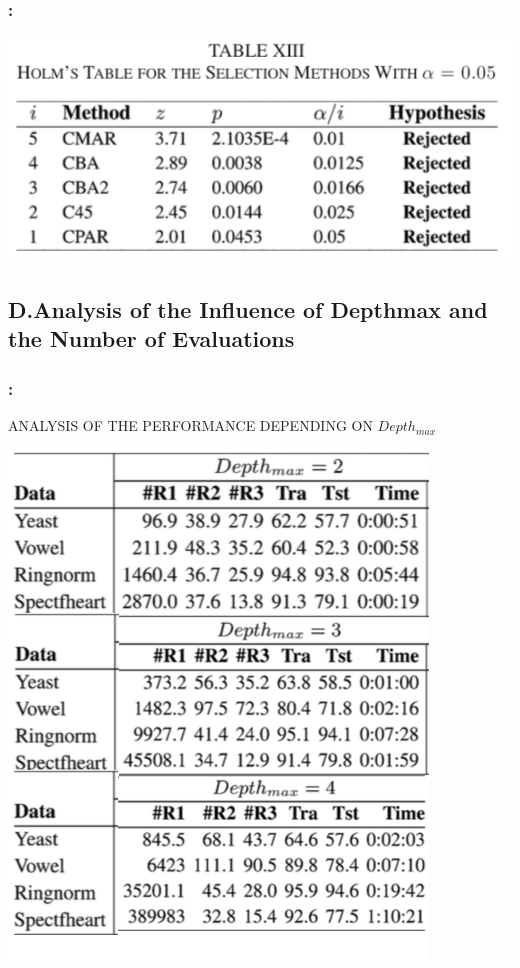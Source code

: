 \documentclass{beamer}
\begin{document}
\begin{CJK*}{UTF8}{bsmi}
\begin{frame}
	\frametitle{\insertsection : \insertsubsection}
	\begin{center}
		\includegraphics[width=1\textheight]{./21.png}
	\end{center}
\end{frame}


\subsection{D.Analysis of the Influence of Depthmax and the Number of Evaluations}

\begin{frame}
	\frametitle{\insertsection : \insertsubsection}
	ANALYSIS OF THE PERFORMANCE DEPENDING ON $Depth_{max}$
	\begin{center}
		\includegraphics[height=.75\textheight]{./22-1.png}
	\end{center}
\end{frame}


\end{CJK*}
\end{document}
